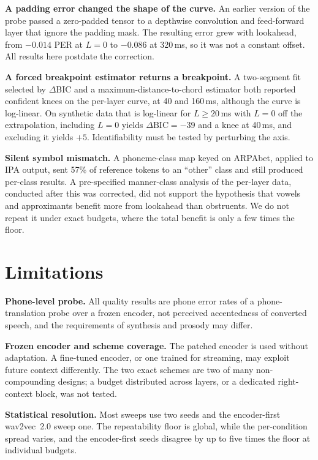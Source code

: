 \documentclass[preprint,12pt,authoryear]{elsarticle}
\begin{document}
\textbf{A padding error changed the shape of the curve.} An earlier version
of the probe passed a zero-padded tensor to a depthwise convolution and
feed-forward layer that ignore the padding mask. The resulting error grew
with lookahead, from $-0.014$ PER at $L=0$ to $-0.086$ at 320\,ms, so it was
not a constant offset. All results here postdate the correction.

\textbf{A forced breakpoint estimator returns a breakpoint.} A two-segment fit
selected by $\Delta$BIC \citep{kassraftery1995} and a
maximum-distance-to-chord estimator both reported confident knees on the
per-layer curve, at 40 and 160\,ms, although the curve is log-linear. On
synthetic data that is log-linear for $L\ge20$\,ms with $L=0$ off the
extrapolation, including $L=0$ yields $\Delta\mathrm{BIC}=-39$ and a knee at
40\,ms, and excluding it yields $+5$. Identifiability must be tested by
perturbing the axis.

\textbf{Silent symbol mismatch.} A phoneme-class map keyed on ARPAbet, applied
to IPA output, sent 57\% of reference tokens to an ``other'' class and still
produced per-class results. A pre-specified manner-class analysis of the
per-layer data, conducted after this was corrected, did not support the
hypothesis that vowels and approximants benefit more from lookahead than
obstruents. We do not repeat it under exact budgets, where the total benefit
is only a few times the floor.

\section{Limitations}
\label{sec:limitations}

\textbf{Phone-level probe.} All quality results are phone error rates of a
phone-translation probe over a frozen encoder, not perceived accentedness of
converted speech, and the requirements of synthesis and prosody may differ.

\textbf{Frozen encoder and scheme coverage.} The patched encoder is used
without adaptation. A fine-tuned encoder, or one trained for streaming, may
exploit future context differently. The two exact schemes are two of many
non-compounding designs; a budget distributed across layers, or a dedicated
right-context block, was not tested.

\textbf{Statistical resolution.} Most sweeps use two seeds and the
encoder-first wav2vec~2.0 sweep one. The repeatability floor is global, while
the per-condition spread varies, and the encoder-first seeds disagree by up to
five times the floor at individual budgets.
\end{document}
